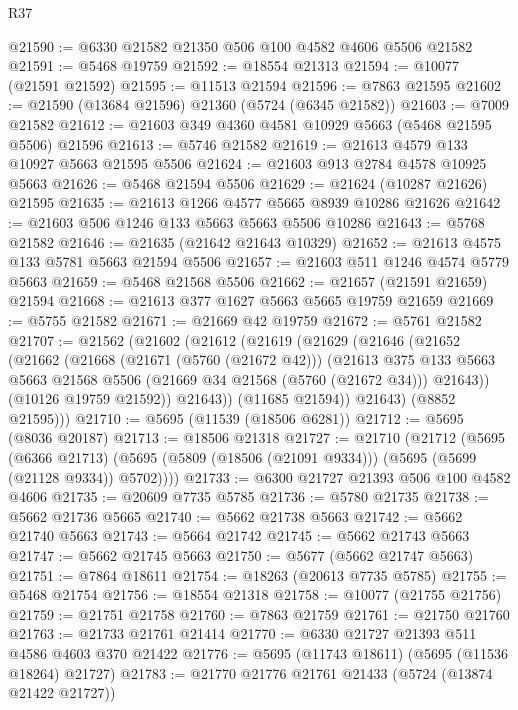 \begin{lexlean}{R37}
\begin{coremodule}
@21590 := @6330 @21582 @21350 @506 @100 @4582 @4606 @5506 @21582
@21591 := @5468 @19759
@21592 := @18554 @21313
@21594 := @10077 (@21591 @21592)
@21595 := @11513 @21594
@21596 := @7863 @21595
@21602 := @21590 (@13684 @21596) @21360 (@5724 (@6345 @21582))
@21603 := @7009 @21582
@21612 := @21603 @349 @4360 @4581 @10929 @5663 (@5468 @21595 @5506) @21596
@21613 := @5746 @21582
@21619 := @21613 @4579 @133 @10927 @5663 @21595 @5506
@21624 := @21603 @913 @2784 @4578 @10925 @5663
@21626 := @5468 @21594 @5506
@21629 := @21624 (@10287 @21626) @21595
@21635 := @21613 @1266 @4577 @5665 @8939 @10286 @21626
@21642 := @21603 @506 @1246 @133 @5663 @5663 @5506 @10286
@21643 := @5768 @21582
@21646 := @21635 (@21642 @21643 @10329)
@21652 := @21613 @4575 @133 @5781 @5663 @21594 @5506
@21657 := @21603 @511 @1246 @4574 @5779 @5663
@21659 := @5468 @21568 @5506
@21662 := @21657 (@21591 @21659) @21594
@21668 := @21613 @377 @1627 @5663 @5665 @19759 @21659
@21669 := @5755 @21582
@21671 := @21669 @42 @19759
@21672 := @5761 @21582
@21707 := @21562
    (@21602
      (@21612
        (@21619
          (@21629
            (@21646
              (@21652
                (@21662
                  (@21668
                    (@21671 (@5760 (@21672 @42)))
                    (@21613
                      @375
                      @133
                      @5663
                      @5663
                      @21568
                      @5506
                      (@21669 @34 @21568 (@5760 (@21672 @34)))
                      @21643))
                  (@10126 @19759 @21592))
                @21643))
            (@11685 @21594))
          @21643)
        (@8852 @21595)))
@21710 := @5695 (@11539 (@18506 @6281))
@21712 := @5695 (@8036 @20187)
@21713 := @18506 @21318
@21727 := @21710
    (@21712
      (@5695
        (@6366 @21713)
        (@5695 (@5809 (@18506 (@21091 @9334))) (@5695 (@5699 (@21128 @9334)) @5702))))
@21733 := @6300 @21727 @21393 @506 @100 @4582 @4606
@21735 := @20609 @7735 @5785
@21736 := @5780 @21735
@21738 := @5662 @21736 @5665
@21740 := @5662 @21738 @5663
@21742 := @5662 @21740 @5663
@21743 := @5664 @21742
@21745 := @5662 @21743 @5663
@21747 := @5662 @21745 @5663
@21750 := @5677 (@5662 @21747 @5663)
@21751 := @7864 @18611
@21754 := @18263 (@20613 @7735 @5785)
@21755 := @5468 @21754
@21756 := @18554 @21318
@21758 := @10077 (@21755 @21756)
@21759 := @21751 @21758
@21760 := @7863 @21759
@21761 := @21750 @21760
@21763 := @21733 @21761 @21414
@21770 := @6330 @21727 @21393 @511 @4586 @4603 @370 @21422
@21776 := @5695 (@11743 @18611) (@5695 (@11536 @18264) @21727)
@21783 := @21770 @21776 @21761 @21433 (@5724 (@13874 @21422 @21727))

\end{coremodule}
\end{lexlean}
